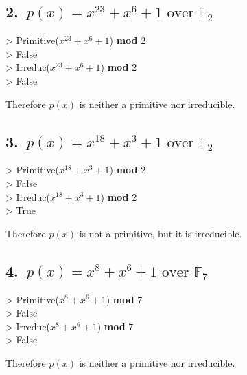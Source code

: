 \documentclass[12pt]{article}
\newenvironment{Courier}{\fontfamily{pcr}\selectfont}{\par}
\begin{document}
    \subsection*{2.\ \(p(x) = x^{23} + x^6 + 1 \text{ over } \mathbb{F}_2\)}

        \begin{Courier}
        \hspace*{10pt} > Primitive(\(x^{23} + x^6 + 1\)) \textbf{mod} 2
        \\
        \hspace*{10pt} > False
        \\
        \hspace*{10pt} > Irreduc(\(x^{23} + x^6 + 1\)) \textbf{mod} 2
        \\
        \hspace*{10pt} > False
        \end{Courier}
        Therefore \(p(x)\) is neither a primitive nor irreducible.

    \subsection*{3.\ \(p(x) = x^{18} + x^3 + 1 \text{ over } \mathbb{F}_2\)}

        \begin{Courier}
        \hspace*{10pt} > Primitive(\(x^{18} + x^3 + 1\)) \textbf{mod} 2
        \\
        \hspace*{10pt} > False
        \\
        \hspace*{10pt} > Irreduc(\(x^{18} + x^3 + 1\)) \textbf{mod} 2
        \\
        \hspace*{10pt} > True
        \end{Courier}
        Therefore \(p(x)\) is not a primitive, but it is irreducible.

    \subsection*{4.\ \(p(x) = x^{8} + x^6 + 1 \text{ over } \mathbb{F}_7\)}

        \begin{Courier}
        \hspace*{10pt} > Primitive(\(x^{8} + x^6 + 1\)) \textbf{mod} 7
        \\
        \hspace*{10pt} > False
        \\
        \hspace*{10pt} > Irreduc(\(x^{8} + x^6 + 1\)) \textbf{mod} 7
        \\
        \hspace*{10pt} > False
        \end{Courier}
        Therefore \(p(x)\) is neither a primitive nor irreducible.
\end{document}
